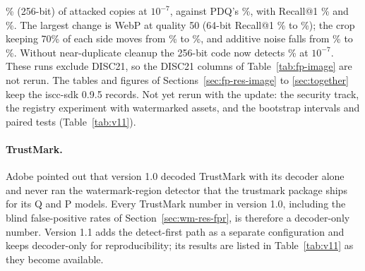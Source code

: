 \% (256-bit) of attacked copies at $10^{-7}$, against PDQ's \%, with Recall@1 \% and \%. The largest change is WebP at quality 50 (64-bit Recall@1 \% to \%); the crop keeping 70\% of each side moves from \% to \%, and additive noise falls from \% to \%. Without near-duplicate cleanup the 256-bit code now detects \% at $10^{-7}$. These runs exclude DISC21, so the DISC21 columns of Table~\ref{tab:fp-image} are not rerun. The tables and figures of Sections~\ref{sec:fp-res-image} to \ref{sec:together} keep the iscc-sdk 0.9.5 records. Not yet rerun with the update: the security track, the registry experiment with watermarked assets, and the bootstrap intervals and paired tests (Table~\ref{tab:v11}).

\paragraph{TrustMark.} Adobe pointed out that version 1.0 decoded TrustMark with its decoder alone and never ran the watermark-region detector that the trustmark package ships for its Q and P models. Every TrustMark number in version 1.0, including the blind false-positive rates of Section~\ref{sec:wm-res-fpr}, is therefore a decoder-only number. Version 1.1 adds the detect-first path as a separate configuration and keeps decoder-only for reproducibility; its results are listed in Table~\ref{tab:v11} as they become available.


